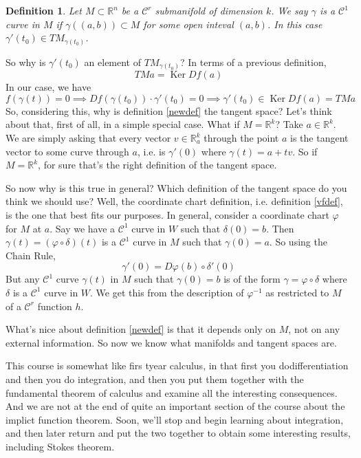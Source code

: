 \documentclass{article}
\newtheorem{definition}{Definition}
\DeclareMathOperator{\Ker}{Ker}
\newcommand{\reals}[0]{\mathbb{R}}
\newcommand{\mc}[1]{\mathcal{#1}}
\begin{document}
\begin{definition}
  Let \(M \subset \reals^n\) be a \(\mc{C}^r\) submanifold of dimension \(k\). We say \(\gamma\) is a \(\mc{C}^1\) curve in \(M\) if \(\gamma((a, b)) \subset M\) for some open inteval \((a, b)\). In this case \(\gamma'(t_0) \in TM_{\gamma(t_0)}\).
  \label{c1mcurve}
\end{definition}
So why is \(\gamma'(t_0)\) an element of \(TM_{\gamma(t_0)}\)? In terms of a previous definition,
\begin{equation}TMa = \Ker Df(a)\end{equation}
In our case, we have
\begin{equation}f(\gamma(t)) = 0 \implies Df(\gamma(t_0)) \cdot \gamma'(t_0) = 0 \implies \gamma'(t_0) \in \Ker Df(a) = TMa\end{equation}
So, considering this, why is definition \ref{newdef} the tangent space? Let's think about that, first of all, in a simple special case. What if \(M = \reals^k\)? Take \(a \in \reals^k\). We are simply asking that every vector \(v \in \reals_a^k\) through the point \(a\) is the tangent vector to some curve through \(a\), i.e. is \(\gamma'(0)\) where \(\gamma(t) = a + tv\). So if \(M = \reals^k\), for sure that's the right definition of the tangent space.

So now why is this true in general? Which definition of the tangent space do you think we should use? Well, the coordinate chart definition, i.e. definition \ref{vfdef}, is the one that best fits our purposes. In general, consider a coordinate chart \(\varphi\) for \(M\) at \(a\). Say we have a \(\mc{C}^1\) curve in \(W\) such that \(\delta(0) = b\). Then
\(\gamma(t) = (\varphi \circ \delta)(t)\)
is a \(\mc{C}^1\) curve in \(M\) such that \(\gamma(0) = a\). So using the Chain Rule,
\begin{equation}\gamma'(0) = D\varphi(b) \circ \delta'(0)\end{equation}
But any \(\mc{C}^1\) curve \(\gamma(t)\) in \(M\) such that \(\gamma(0) = b\) is of the form
\(\gamma = \varphi \circ \delta\)
where \(\delta\) is a \(\mc{C}^1\) curve in \(W\). We get this from the description of \(\varphi^{-1}\) as restricted to \(M\) of a \(\mc{C}^r\) function \(h\).

What's nice about definition \ref{newdef} is that it depends only on \(M\), not on any external information. So now we know what manifolds and tangent spaces are.

This course is somewhat like firs tyear calculus, in that first you dodifferentiation and then you do integration, and then you put them together with the fundamental theorem of calculus and examine all the interesting consequences. And we are not at the end of quite an important section of the course about the implict function theorem. Soon, we'll stop and begin learning about integration, and then later return and put the two together to obtain some interesting results, including Stokes theorem.
\end{document}
